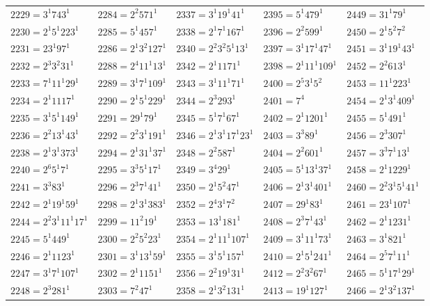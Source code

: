 {\begin{longtable}[c]{*{5}{l}}
$2229=3^{1}743^{1}$&$2284=2^{2}571^{1}$&$2337=3^{1}19^{1}41^{1}$&$2395=5^{1}479^{1}$&$2449=31^{1}79^{1}$\\
$2230=2^{1}5^{1}223^{1}$&$2285=5^{1}457^{1}$&$2338=2^{1}7^{1}167^{1}$&$2396=2^{2}599^{1}$&$2450=2^{1}5^{2}7^{2}$\\
$2231=23^{1}97^{1}$&$2286=2^{1}3^{2}127^{1}$&$2340=2^{2}3^{2}5^{1}13^{1}$&$2397=3^{1}17^{1}47^{1}$&$2451=3^{1}19^{1}43^{1}$\\
$2232=2^{3}3^{2}31^{1}$&$2288=2^{4}11^{1}13^{1}$&$2342=2^{1}1171^{1}$&$2398=2^{1}11^{1}109^{1}$&$2452=2^{2}613^{1}$\\
$2233=7^{1}11^{1}29^{1}$&$2289=3^{1}7^{1}109^{1}$&$2343=3^{1}11^{1}71^{1}$&$2400=2^{5}3^{1}5^{2}$&$2453=11^{1}223^{1}$\\
$2234=2^{1}1117^{1}$&$2290=2^{1}5^{1}229^{1}$&$2344=2^{3}293^{1}$&$2401=7^{4}$&$2454=2^{1}3^{1}409^{1}$\\
$2235=3^{1}5^{1}149^{1}$&$2291=29^{1}79^{1}$&$2345=5^{1}7^{1}67^{1}$&$2402=2^{1}1201^{1}$&$2455=5^{1}491^{1}$\\
$2236=2^{2}13^{1}43^{1}$&$2292=2^{2}3^{1}191^{1}$&$2346=2^{1}3^{1}17^{1}23^{1}$&$2403=3^{3}89^{1}$&$2456=2^{3}307^{1}$\\
$2238=2^{1}3^{1}373^{1}$&$2294=2^{1}31^{1}37^{1}$&$2348=2^{2}587^{1}$&$2404=2^{2}601^{1}$&$2457=3^{3}7^{1}13^{1}$\\
$2240=2^{6}5^{1}7^{1}$&$2295=3^{3}5^{1}17^{1}$&$2349=3^{4}29^{1}$&$2405=5^{1}13^{1}37^{1}$&$2458=2^{1}1229^{1}$\\
$2241=3^{3}83^{1}$&$2296=2^{3}7^{1}41^{1}$&$2350=2^{1}5^{2}47^{1}$&$2406=2^{1}3^{1}401^{1}$&$2460=2^{2}3^{1}5^{1}41^{1}$\\
$2242=2^{1}19^{1}59^{1}$&$2298=2^{1}3^{1}383^{1}$&$2352=2^{4}3^{1}7^{2}$&$2407=29^{1}83^{1}$&$2461=23^{1}107^{1}$\\
$2244=2^{2}3^{1}11^{1}17^{1}$&$2299=11^{2}19^{1}$&$2353=13^{1}181^{1}$&$2408=2^{3}7^{1}43^{1}$&$2462=2^{1}1231^{1}$\\
$2245=5^{1}449^{1}$&$2300=2^{2}5^{2}23^{1}$&$2354=2^{1}11^{1}107^{1}$&$2409=3^{1}11^{1}73^{1}$&$2463=3^{1}821^{1}$\\
$2246=2^{1}1123^{1}$&$2301=3^{1}13^{1}59^{1}$&$2355=3^{1}5^{1}157^{1}$&$2410=2^{1}5^{1}241^{1}$&$2464=2^{5}7^{1}11^{1}$\\
$2247=3^{1}7^{1}107^{1}$&$2302=2^{1}1151^{1}$&$2356=2^{2}19^{1}31^{1}$&$2412=2^{2}3^{2}67^{1}$&$2465=5^{1}17^{1}29^{1}$\\
$2248=2^{3}281^{1}$&$2303=7^{2}47^{1}$&$2358=2^{1}3^{2}131^{1}$&$2413=19^{1}127^{1}$&$2466=2^{1}3^{2}137^{1}$\\

\end{longtable}}
